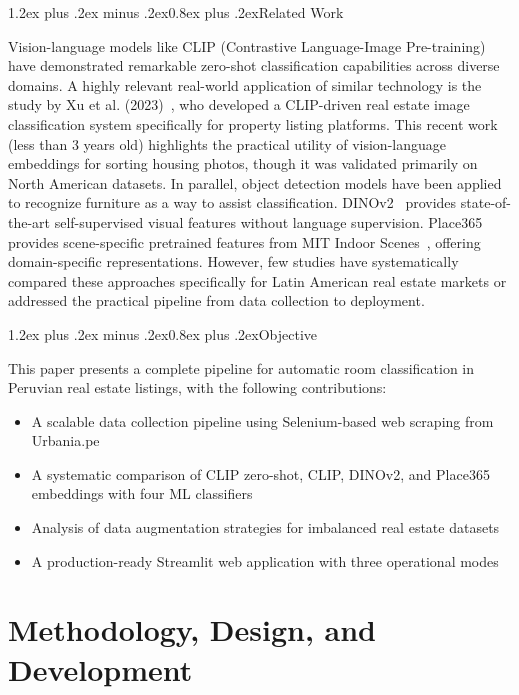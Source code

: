 \documentclass[conference]{IEEEtran}
\makeatletter
\renewcommand{\subsection}{\@startsection{subsection}{2}{\z@}%
  {1.2ex plus .2ex minus .2ex}{0.8ex plus .2ex}{\normalfont\bfseries}}
\makeatother
\begin{document}
\subsection{Related Work}

Vision-language models like CLIP (Contrastive Language-Image Pre-training)~\cite{radford2021clip} have demonstrated remarkable zero-shot classification capabilities across diverse domains. A highly relevant real-world application of similar technology is the study by Xu et al. (2023)~\cite{xu2023clip}, who developed a CLIP-driven real estate image classification system specifically for property listing platforms. This recent work (less than 3 years old) highlights the practical utility of vision-language embeddings for sorting housing photos, though it was validated primarily on North American datasets. In parallel, object detection models have been applied to recognize furniture as a way to assist classification. DINOv2~\cite{oquab2023dinov2} provides state-of-the-art self-supervised visual features without language supervision. Place365~\cite{zhou2018places} provides scene-specific pretrained features from MIT Indoor Scenes~\cite{mit_indoor}, offering domain-specific representations. However, few studies have systematically compared these approaches specifically for Latin American real estate markets or addressed the practical pipeline from data collection to deployment.

\subsection{Objective}

This paper presents a complete pipeline for automatic room classification in Peruvian real estate listings, with the following contributions:

\begin{itemize}
\item A scalable data collection pipeline using Selenium-based web scraping from Urbania.pe
\item A systematic comparison of CLIP zero-shot, CLIP, DINOv2, and Place365 embeddings with four ML classifiers
\item Analysis of data augmentation strategies for imbalanced real estate datasets
\item A production-ready Streamlit web application with three operational modes
\end{itemize}

\section{Methodology, Design, and Development}
\end{document}
